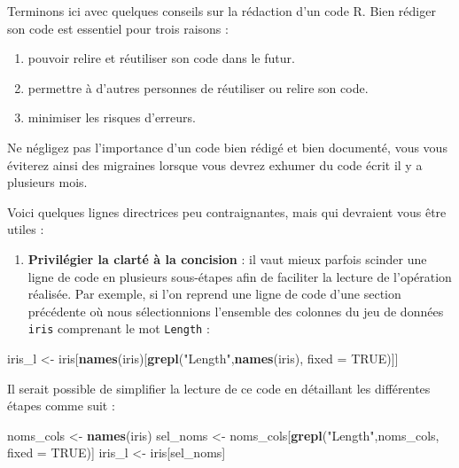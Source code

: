 \documentclass[
  11pt,
  french,
]{book}
\makeatletter
\newenvironment{Shaded}{\begin{snugshade}}{\end{snugshade}}
\newcommand{\DataTypeTok}[1]{\textcolor[rgb]{0.13,0.29,0.53}{#1}}
\newcommand{\KeywordTok}[1]{\textcolor[rgb]{0.13,0.29,0.53}{\textbf{#1}}}
\newcommand{\NormalTok}[1]{#1}
\newcommand{\OtherTok}[1]{\textcolor[rgb]{0.56,0.35,0.01}{#1}}
\newcommand{\StringTok}[1]{\textcolor[rgb]{0.31,0.60,0.02}{#1}}
\providecommand{\tightlist}{%
  \setlength{\itemsep}{0pt}\setlength{\parskip}{0pt}}
\newenvironment{kframe}{%
\medskip{}
\setlength{\fboxsep}{.8em}
 \def\at@end@of@kframe{}%
 \ifinner\ifhmode%
  \def\at@end@of@kframe{\end{minipage}}%
  \begin{minipage}{\columnwidth}%
 \fi\fi%
 \def\FrameCommand##1{\hskip\@totalleftmargin \hskip-\fboxsep
 \colorbox{shadecolor}{##1}\hskip-\fboxsep
     \hskip-\linewidth \hskip-\@totalleftmargin \hskip\columnwidth}%
 \MakeFramed {\advance\hsize-\width
   \@totalleftmargin\z@ \linewidth\hsize
   \@setminipage}}%
 {\par\unskip\endMakeFramed%
 \at@end@of@kframe}
\renewenvironment{Shaded}{\begin{kframe}}{\end{kframe}}
\makeatother
\begin{document}
Terminons ici avec quelques conseils sur la rédaction d'un code R. Bien rédiger son code est essentiel pour trois raisons :

\begin{enumerate}
\def\labelenumi{\arabic{enumi}.}
\tightlist
\item
  pouvoir relire et réutiliser son code dans le futur.
\item
  permettre à d'autres personnes de réutiliser ou relire son code.
\item
  minimiser les risques d'erreurs.
\end{enumerate}

Ne négligez pas l'importance d'un code bien rédigé et bien documenté, vous vous éviterez ainsi des migraines lorsque vous devrez exhumer du code écrit il y a plusieurs mois.

Voici quelques lignes directrices peu contraignantes, mais qui devraient vous être utiles :

\begin{enumerate}
\def\labelenumi{\arabic{enumi}.}
\tightlist
\item
  \textbf{Privilégier la clarté à la concision} : il vaut mieux parfois scinder une ligne de code en plusieurs sous-étapes afin de faciliter la lecture de l'opération réalisée. Par exemple, si l'on reprend une ligne de code d'une section précédente où nous sélectionnions l'ensemble des colonnes du jeu de données \texttt{iris} comprenant le mot \texttt{Length} :
\end{enumerate}

\begin{Shaded}
\begin{Highlighting}[]
\NormalTok{iris_l <-}\StringTok{ }\NormalTok{iris[}\KeywordTok{names}\NormalTok{(iris)[}\KeywordTok{grepl}\NormalTok{(}\StringTok{"Length"}\NormalTok{,}\KeywordTok{names}\NormalTok{(iris), }\DataTypeTok{fixed =} \OtherTok{TRUE}\NormalTok{)]]}
\end{Highlighting}
\end{Shaded}

Il serait possible de simplifier la lecture de ce code en détaillant les différentes étapes comme suit :

\begin{Shaded}
\begin{Highlighting}[]
\NormalTok{noms_cols <-}\StringTok{ }\KeywordTok{names}\NormalTok{(iris)}
\NormalTok{sel_noms <-}\StringTok{ }\NormalTok{noms_cols[}\KeywordTok{grepl}\NormalTok{(}\StringTok{"Length"}\NormalTok{,noms_cols, }\DataTypeTok{fixed =} \OtherTok{TRUE}\NormalTok{)]}
\NormalTok{iris_l <-}\StringTok{ }\NormalTok{iris[sel_noms]}
\end{Highlighting}
\end{Shaded}
\end{document}
